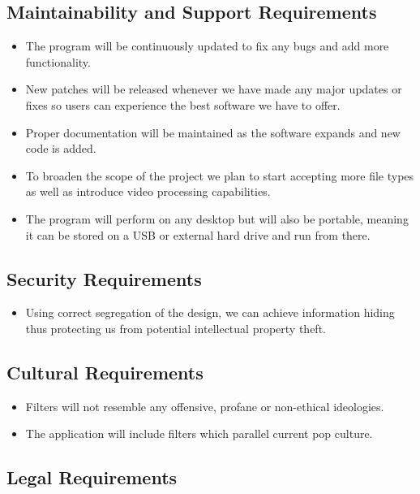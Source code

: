 \documentclass[12pt, titlepage]{article}
\begin{document}
\subsection{Maintainability and Support Requirements}

\begin{itemize}
\item The program will be continuously updated to fix any bugs and add more functionality.
\item New patches will be released whenever we have made any major updates or fixes so users can experience the best software we have to offer.
\item Proper documentation will be maintained as the software expands and new code is added.
\item To broaden the scope of the project we plan to start accepting more file types as well as introduce video processing capabilities.
\item The program will perform on any desktop but will also be portable, meaning it can be stored on a USB or external hard drive and run from there.
\end{itemize}

\subsection{Security Requirements}

\begin{itemize}
\item Using correct segregation of the design, we can achieve information hiding thus protecting us from potential intellectual property theft.
\end{itemize}

\subsection{Cultural Requirements}

\begin{itemize}
\item Filters will not resemble any offensive, profane or non-ethical ideologies.
\item The application will include filters which parallel current pop culture.
\end{itemize}

\subsection{Legal Requirements}
\end{document}
